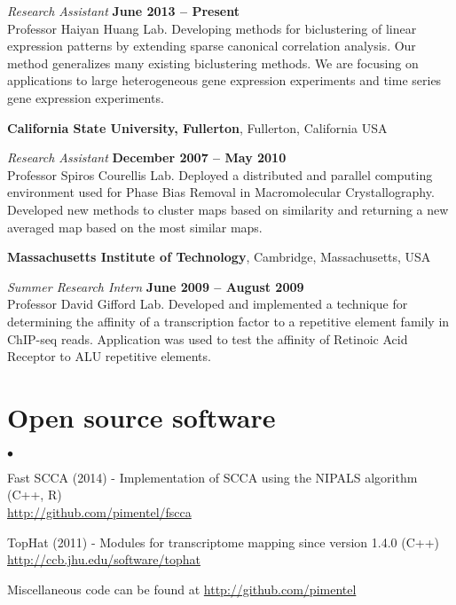 \documentclass[margin,line]{res}
\newenvironment{list2}{
  \begin{list}{$\bullet$}{%
      \setlength{\itemsep}{0in}
      \setlength{\parsep}{0in} \setlength{\parskip}{0in}
      \setlength{\topsep}{0in} \setlength{\partopsep}{0in}
      \setlength{\leftmargin}{0.2in}}}{\end{list}}
\begin{document}
\begin{resume}
{\em Research Assistant} \hfill {\bf June 2013 -- Present}\\
Professor Haiyan Huang Lab. Developing methods for biclustering of linear
expression patterns by extending sparse canonical correlation analysis. Our
method generalizes many existing biclustering methods. We are focusing on
applications to large heterogeneous gene expression experiments and time series
gene expression experiments.

{\bf California State University, Fullerton}, Fullerton, California USA
\vspace{-.3cm}

{\em Research Assistant} \hfill {\bf December 2007 -- May 2010}\\
Professor Spiros Courellis Lab. Deployed a distributed and parallel computing
environment used for Phase Bias Removal in Macromolecular Crystallography.
Developed new methods to cluster maps based on similarity and returning a new
averaged map based on the most similar maps.

\newpage

{\bf Massachusetts Institute of Technology}, Cambridge, Massachusetts,
USA

\vspace{-.3cm}
{\em Summer Research Intern} \hfill {\bf June 2009 -- August 2009}\\
Professor David Gifford Lab. Developed and implemented a technique for
determining the affinity of a transcription factor to a repetitive element
family in ChIP-seq reads. Application was used to test the affinity of Retinoic
Acid Receptor to ALU repetitive elements.

\section{\sc Open source software}
\begin{list2}
  \item Fast SCCA (2014) - Implementation of SCCA using the NIPALS algorithm (C++, R) \\
    \url{http://github.com/pimentel/fscca}
  \item TopHat (2011) - Modules for transcriptome mapping since version 1.4.0 (C++) \\
    \url{http://ccb.jhu.edu/software/tophat}
  \item Miscellaneous code can be found at \url{http://github.com/pimentel}
\end{list2}


\end{resume}
\end{document}
